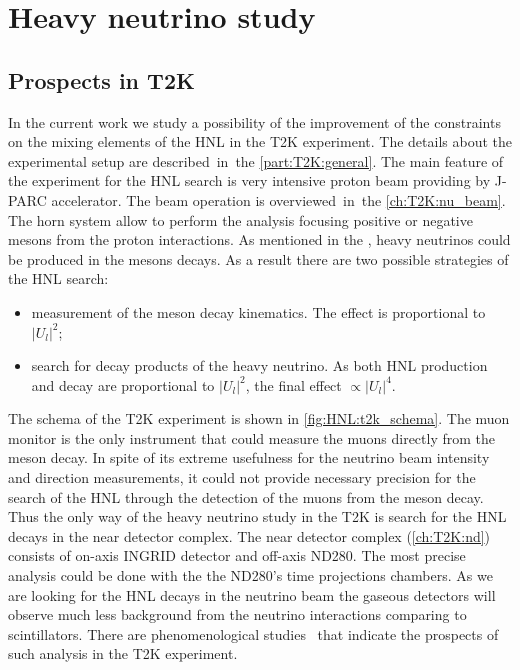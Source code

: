\documentclass[../main.tex]{subfiles}
\begin{document}
\renewcommand{\labelitemi}{\ding{226}}
\renewcommand{\labelitemii}{\ding{227}}

\part{Heavy neutrino study}

\chapter{Prospects in T2K}


In the current work we study a possibility of the improvement of the constraints on the mixing elements of the HNL in the T2K experiment. The details about the experimental setup are described~in~the \autoref{part:T2K:general}. The main feature of the experiment for the HNL search is very intensive proton beam providing by J-PARC accelerator. The beam operation is overviewed~in~the \autoref{ch:T2K:nu_beam}. The horn system allow to perform the analysis focusing positive or negative mesons from the proton interactions. As mentioned in the , heavy neutrinos could be produced in the mesons decays. As a result there are two possible strategies of the HNL search:
\begin{itemize}
    \item measurement of the meson decay kinematics. The effect is proportional to $\left|U_l\right|^2$;
    \item search for decay products of the heavy neutrino. As both HNL production and decay are proportional to $\left|U_l\right|^2$, the final effect $\propto\left|U_l\right|^4$.
\end{itemize}

The schema of the T2K experiment is shown in \autoref{fig:HNL:t2k_schema}. The muon monitor is the only instrument that could measure the muons directly from the meson decay. In spite of its extreme usefulness for the neutrino beam intensity and direction measurements, it could not provide necessary precision for the search of the HNL through the detection of the muons from the meson decay. Thus the only way of the heavy neutrino study in the T2K is search for the HNL decays in the near detector complex. The near detector complex (\autoref{ch:T2K:nd}) consists of on-axis INGRID detector and off-axis ND280. The most precise analysis could be done with the the ND280's time projections chambers. As we are looking for the HNL decays in the neutrino beam the gaseous detectors will observe much less background from the neutrino interactions comparing to scintillators. There are phenomenological studies~\cite{Asaka2012} that indicate the prospects of such analysis in the T2K experiment.
\end{document}
